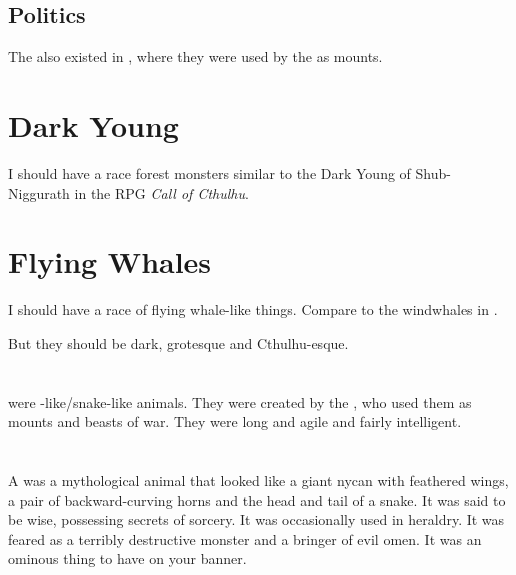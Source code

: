 \subsection{Politics}
The \carths also existed in \Nyx, where they were used by the \resphain as mounts. 















\section{Dark Young}
I should have a race forest monsters similar to the Dark Young of Shub-Niggurath in the RPG \emph{Call of Cthulhu}. 














\section{Flying Whales}
I should have a race of flying whale-like things. 
Compare to the windwhales in \cite{GlenCook:TheWhiteRose}. 

But they should be dark, grotesque and Cthulhu-esque. 














\section{\Lindworm}
\index{\lindworm}
\Lindworms were \dragon-like/snake-like animals. 
They were created by the \ophidians, who used them as mounts and beasts of war. 
They were long and agile and fairly intelligent. 














\section{\Malgryph}
\index{\malgryph}
A \malgryph was a mythological animal that looked like a giant nycan with feathered wings, a pair of backward-curving horns and the head and tail of a snake.
It was said to be wise, possessing secrets of sorcery.
It was occasionally used in heraldry. 
It was feared as a terribly destructive monster and a bringer of evil omen.
It was an ominous thing to have on your banner.

